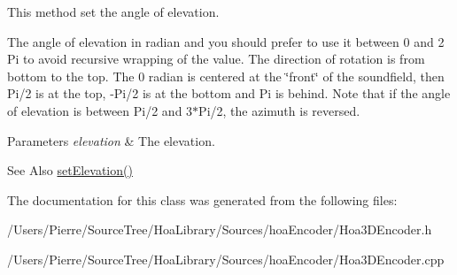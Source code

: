 This method set the angle of elevation. 

The angle of elevation in radian and you should prefer to use it between 0 and 2 Pi to avoid recursive wrapping of the value. The direction of rotation is from bottom to the top. The 0 radian is centered at the \char`\"{}front\char`\"{} of the soundfield, then Pi/2 is at the top, -\/\-Pi/2 is at the bottom and Pi is behind. Note that if the angle of elevation is between Pi/2 and 3$\ast$\-Pi/2, the azimuth is reversed.


\begin{DoxyParams}{Parameters}
{\em elevation} & The elevation. \\
\hline
\end{DoxyParams}
\begin{DoxySeeAlso}{See Also}
\hyperlink{class_hoa3_d_1_1_encoder_a3bf01c6ecd90108c66c19ce7e5bde97d}{set\-Elevation()} 
\end{DoxySeeAlso}


The documentation for this class was generated from the following files\-:\begin{DoxyCompactItemize}
\item 
/\-Users/\-Pierre/\-Source\-Tree/\-Hoa\-Library/\-Sources/hoa\-Encoder/Hoa3\-D\-Encoder.\-h\item 
/\-Users/\-Pierre/\-Source\-Tree/\-Hoa\-Library/\-Sources/hoa\-Encoder/Hoa3\-D\-Encoder.\-cpp\end{DoxyCompactItemize}
